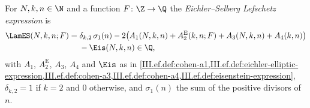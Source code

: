 For $N,k,n\in\N$ and a function $F\colon\Z\to\Q$ the \emph{Eichler--Selberg Lefschetz expression} is
\[
\begin{aligned}
  \LamES(N,k,n;F)={}&\delta_{k,2}\,\sigma_1(n)-2\bigl(A_1(N,k,n)+A_2^{\mathrm E}(k,n;F)+A_3(N,k,n)+A_4(k,n)\bigr)\\
  &-\Eis(N,k,n)\in\Q,
\end{aligned}
\]
with $A_1$, $A_2^{\mathrm E}$, $A_3$, $A_4$ and $\Eis$ as in
\cref{III.ef.def:cohen-a1,III.ef.def:eichler-elliptic-expression,III.ef.def:cohen-a3,III.ef.def:cohen-a4,III.ef.def:eisenstein-expression},
$\delta_{k,2}=1$ if $k=2$ and $0$ otherwise, and $\sigma_1(n)$ the sum of the positive divisors of $n$.
